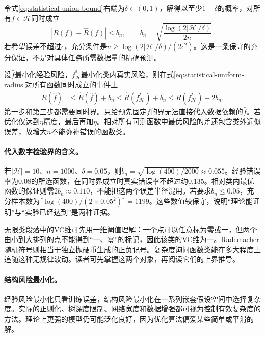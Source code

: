 令式\eqref{eq:statistical-union-bound}右端为$\delta\in(0,1)$，解得以至少$1-\delta$的概率，对所有$f\in\mathcal H$同时成立
\begin{equation}
 |R(f)-\hat R(f)|\leq b_n,
 \qquad b_n=\sqrt{\frac{\log(2|\mathcal H|/\delta)}{2n}}.\label{eq:statistical-uniform-radius}
\end{equation}
若希望误差不超过$\epsilon$，充分条件是$n\geq\log(2|\mathcal H|/\delta)/(2\epsilon^2)$。这是一条保守的充分保证，不是对具体任务所需数据量的精确预测。

设$\hat f$最小化经验风险，$f_{\mathcal H}^*$最小化类内真实风险，则在式\eqref{eq:statistical-uniform-radius}对所有函数同时成立的事件上
\begin{align}
 R(\hat f)&\leq\hat R(\hat f)+b_n
 \leq\hat R(f_{\mathcal H}^*)+b_n
 \leq R(f_{\mathcal H}^*)+2b_n.
\end{align}
第一步和第三步都需要同时界。只给预先固定$f$的界无法直接代入数据依赖的$\hat f$。若优化仅达到$\eta$精度，最后再加$\eta$。相对所有可测函数中最优风险的差还包含类外近似误差，故增大$n$不能弥补错误的函数类。

\paragraph{代入数字检验界的含义。}
若$|\mathcal H|=10$、$n=1000$、$\delta=0.05$，则$b_n=\sqrt{\log(400)/2000}\approx0.055$。经验错误率为$0.08$的所选函数，在同时界成立时真实错误率不超过约$0.135$。相对类内最优函数的保证则需$2b_n\approx0.110$，不能把这两个误差半径混用。若要求$b_n\leq0.05$，充分样本数为$\lceil\log(400)/(2\times0.05^2)\rceil=1199$。这些数值较保守，说明“理论能证明”与“实验已经达到”是两种证据。

无限类段落中的VC维可先用一维阈值理解：一个点可以任意标为零或一，但两个由小到大排列的点不能得到“一、零”的标记，因此该类的VC维为一。Rademacher随机符号则相当于独立抛硬币生成的正负记号。复杂度询问函数类能在多大程度上追随这种无规律波动。读者可先掌握这两个对象，再阅读它们的上界推导。

\paragraph{结构风险最小化。}
经验风险最小化只看训练误差，结构风险最小化在一系列嵌套假设空间中选择复杂度。实际的正则化、树深度限制、网络宽度和数据增强都可视为控制有效复杂度的方法。理论上更强的模型仍可能泛化良好，因为优化算法偏爱某些简单或平滑的解。

